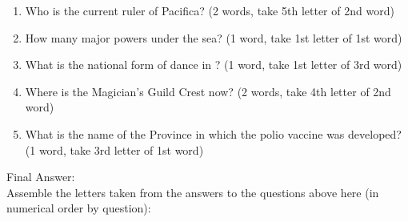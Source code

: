 \documentclass[green]{NeptuneBall}
\begin{document}
\begin{enumerate}
	\item Who is the current ruler of Pacifica? (2 words, take 5th letter of 2nd word) \vspace{3 mm}\\ \underline{\hspace{15cm}}
	\item How many major powers under the sea? (1 word, take 1st letter of 1st word) \vspace{3 mm}\\ \underline{\hspace{15cm}}
	\item What is the national form of dance in \pAtlantis{}? (1 word, take 1st letter of 3rd word) \vspace{3 mm}\\ \underline{\hspace{15cm}}
	\item Where is the Magician's Guild Crest now? (2 words, take 4th letter of 2nd word) \vspace{3 mm}\\ \underline{\hspace{15cm}}
	\item What is the name of the Province in which the polio vaccine was developed? (1 word, take 3rd letter of 1st word) \vspace{3 mm}\\ \underline{\hspace{15cm}} \vspace{10 mm}
\end{enumerate}

{\Large Final Answer:}\\
Assemble the letters taken from the answers to the questions above here (in numerical order by question): \vspace{5 mm}

\underline{\hspace{.5cm}} \underline{\hspace{.5cm}} \underline{\hspace{.5cm}} \underline{\hspace{.5cm}} \underline{\hspace{.5cm}} \underline{\hspace{.5cm}} \underline{\hspace{.5cm}} \underline{\hspace{.5cm}} \underline{\hspace{.5cm}} \underline{\hspace{.5cm}} \underline{\hspace{.5cm}} \underline{\hspace{.5cm}} \underline{\hspace{.5cm}} \underline{\hspace{.5cm}}
\end{document}
